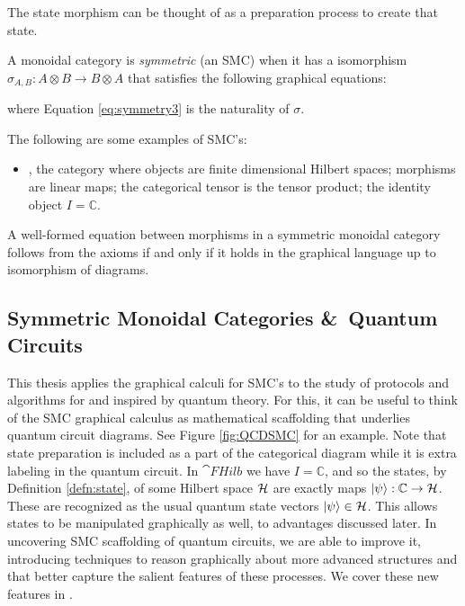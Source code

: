 \noindent The state morphism can be thought of as a preparation process to create that state.

\begin{defn}
A monoidal category is \emph{symmetric} (an SMC) when it has a isomorphism
$\sigma_{A,B}:A\otimes B\to B\otimes A$ that satisfies the following graphical equations:
\begin{equation}
\label{eq:symmetry}

\end{equation}
\begin{equation}
\label{eq:symmetry2}

\end{equation}
\begin{equation}
\label{eq:symmetry3}

\end{equation}
\end{defn}
\noindent where Equation \ref{eq:symmetry3} is the naturality of $\sigma$.

\begin{examples}
The following are some examples of SMC's:
\begin{itemize}
\item {}, the category where objects are finite dimensional Hilbert spaces; morphisms are linear maps; the categorical tensor is the tensor product; the identity object $I=\mathbb{C}$.
\end{itemize}
\end{examples}

\begin{theorem}{\cite[Thm 2.3]{joyal1991geometry}}
A well-formed equation between morphisms in a symmetric monoidal category follows from the axioms if and only if it holds in the graphical language up to isomorphism of diagrams.
\end{theorem}

\subsection{Symmetric Monoidal Categories \&\ Quantum Circuits}
This thesis applies the graphical calculi for SMC's to the study of protocols and algorithms for and inspired by quantum theory. For this, it can be useful to think of the SMC graphical calculus as mathematical scaffolding that underlies quantum circuit diagrams. See Figure \ref{fig:QCDSMC} for an example. Note that state preparation is included as a part of the categorical diagram while it is extra labeling in the quantum circuit. In $\cat{FHilb}$ we have $I=\mathbb{C}$, and so the states, by Definition \ref{defn:state}, of some Hilbert space $\mathcal{H}$ are exactly maps $| \psi \rangle:\mathbb{C}\to\mathcal{H}$. These are recognized as the usual quantum state vectors $| \psi \rangle\in\mathcal{H}$. This allows states to be manipulated graphically as well, to advantages discussed later. In uncovering SMC scaffolding of quantum circuits, we are able to improve it, introducing techniques to reason graphically about more advanced structures and that better capture the salient features of these processes. We cover these new features in .

